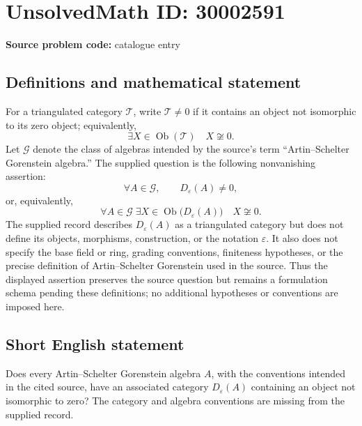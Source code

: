 \documentclass[11pt]{article}
\begin{document}
\section*{UnsolvedMath ID: 30002591}
\textbf{Source problem code:} catalogue entry
\subsection{Definitions and mathematical statement}
For a triangulated category \(\mathcal T\), write \(\mathcal T\neq 0\) if it contains an object not isomorphic to its zero object; equivalently,
\[
\exists X\in\operatorname{Ob}(\mathcal T)\quad X\not\cong 0.
\]
Let \(\mathcal G\) denote the class of algebras intended by the source's term ``Artin--Schelter Gorenstein algebra.'' The supplied question is the following nonvanishing assertion:
\[
\forall A\in\mathcal G,\qquad D_{\varepsilon}(A)\neq 0,
\]
or, equivalently,
\[
\forall A\in\mathcal G\;\exists X\in\operatorname{Ob}\bigl(D_{\varepsilon}(A)\bigr)\quad X\not\cong 0.
\]
The supplied record describes \(D_{\varepsilon}(A)\) as a triangulated category but does not define its objects, morphisms, construction, or the notation \(\varepsilon\). It also does not specify the base field or ring, grading conventions, finiteness hypotheses, or the precise definition of Artin--Schelter Gorenstein used in the source. Thus the displayed assertion preserves the source question but remains a formulation schema pending these definitions; no additional hypotheses or conventions are imposed here.
\subsection{Short English statement}
Does every Artin--Schelter Gorenstein algebra \(A\), with the conventions intended in the cited source, have an associated category \(D_{\varepsilon}(A)\) containing an object not isomorphic to zero? The category and algebra conventions are missing from the supplied record.
\end{document}
